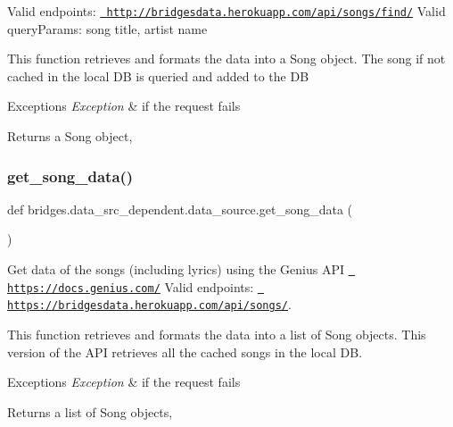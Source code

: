 Valid endpoints\+: \href{http://bridgesdata.herokuapp.com/api/songs/find/}{\texttt{ http\+://bridgesdata.\+herokuapp.\+com/api/songs/find/}} Valid query\+Params\+: song title, artist name

This function retrieves and formats the data into a Song object. The song if not cached in the local DB is queried and added to the DB


\begin{DoxyExceptions}{Exceptions}
{\em Exception} & if the request fails\\
\hline
\end{DoxyExceptions}
\begin{DoxyReturn}{Returns}
a Song object, 
\end{DoxyReturn}
\mbox{\label{namespacebridges_1_1data__src__dependent_1_1data__source_abf7f1f53dc13383fa296cb597e4a7ee0}} 
\subsubsection{\texorpdfstring{get\_song\_data()}{get\_song\_data()}}
{\footnotesize\ttfamily def bridges.\+data\+\_\+src\+\_\+dependent.\+data\+\_\+source.\+get\+\_\+song\+\_\+data (\begin{DoxyParamCaption}{ }\end{DoxyParamCaption})}



Get data of the songs (including lyrics) using the Genius A\+PI \href{https://docs.genius.com/}{\texttt{ https\+://docs.\+genius.\+com/}} Valid endpoints\+: \href{https://bridgesdata.herokuapp.com/api/songs/}{\texttt{ https\+://bridgesdata.\+herokuapp.\+com/api/songs/}}. 

This function retrieves and formats the data into a list of Song objects. This version of the A\+PI retrieves all the cached songs in the local DB.


\begin{DoxyExceptions}{Exceptions}
{\em Exception} & if the request fails\\
\hline
\end{DoxyExceptions}
\begin{DoxyReturn}{Returns}
a list of Song objects, 
\end{DoxyReturn}
\mbox{\label{namespacebridges_1_1data__src__dependent_1_1data__source_a15db0d52db8b6e096db60f99b2f0171d}} 
